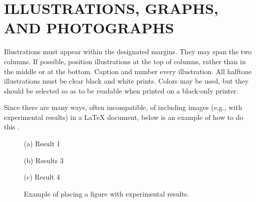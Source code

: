 \documentclass{article}
\begin{document}
\section{ILLUSTRATIONS, GRAPHS, AND PHOTOGRAPHS}
\label{sec:illust}

Illustrations must appear within the designated margins.  They may span the two
columns.  If possible, position illustrations at the top of columns, rather
than in the middle or at the bottom.  Caption and number every illustration.
All halftone illustrations must be clear black and white prints.  Colors may be
used, but they should be selected so as to be readable when printed on a
black-only printer.

Since there are many ways, often incompatible, of including images (e.g., with
experimental results) in a LaTeX document, below is an example of how to do
this \cite{Lamp86}.

\begin{figure}[htb]

\begin{minipage}[b]{1.0\linewidth}
  \centering
  \vspace{2.0cm}
  \centerline{(a) Result 1}\medskip
\end{minipage}
%
\begin{minipage}[b]{.48\linewidth}
  \centering
  \vspace{1.5cm}
  \centerline{(b) Results 3}\medskip
\end{minipage}
\hfill
\begin{minipage}[b]{0.48\linewidth}
  \centering
  \vspace{1.5cm}
  \centerline{(c) Result 4}\medskip
\end{minipage}
%
\caption{Example of placing a figure with experimental results.}
\label{fig:res}
%
\end{figure}

\vfill
\pagebreak
\end{document}
